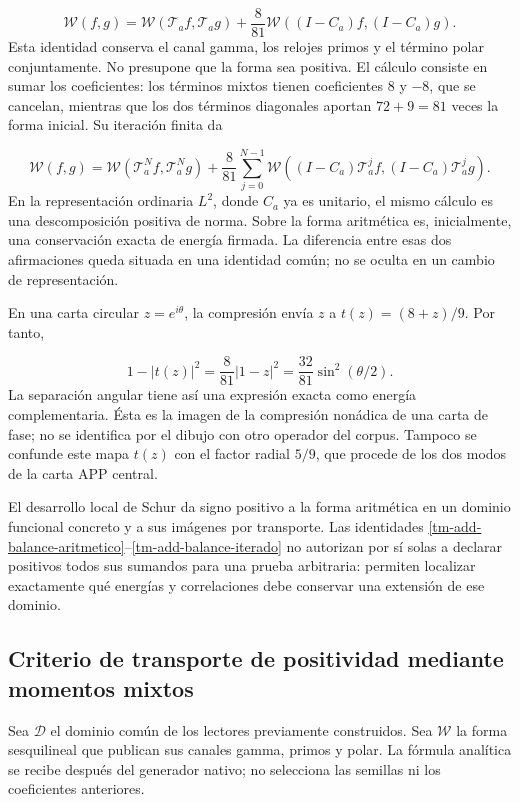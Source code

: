 \begin{equation}
\boxed{\mathscr W(f,g)=\mathscr W(\mathcal T_af,\mathcal T_ag)
+\frac8{81}\mathscr W((I-C_a)f,(I-C_a)g).}
\label{tm-add-balance-aritmetico}
\end{equation}
Esta identidad conserva el canal gamma, los relojes primos y el término polar conjuntamente. No presupone que la forma sea positiva. El cálculo consiste en sumar los coeficientes: los términos mixtos tienen coeficientes \(8\) y \(-8\), que se cancelan, mientras que los dos términos diagonales aportan \(72+9=81\) veces la forma inicial. Su iteración finita da

\begin{equation}
\mathscr W(f,g)=\mathscr W(\mathcal T_a^Nf,\mathcal T_a^Ng)
+\frac8{81}\sum_{j=0}^{N-1}
\mathscr W((I-C_a)\mathcal T_a^jf,(I-C_a)\mathcal T_a^jg).
\label{tm-add-balance-iterado}
\end{equation}
En la representación ordinaria \(L^2\), donde \(C_a\) ya es unitario, el mismo cálculo es una descomposición positiva de norma. Sobre la forma aritmética es, inicialmente, una conservación exacta de energía firmada. La diferencia entre esas dos afirmaciones queda situada en una identidad común; no se oculta en un cambio de representación.

En una carta circular \(z=e^{i\theta}\), la compresión envía \(z\) a \(t(z)=(8+z)/9\). Por tanto,

\[
1-|t(z)|^2=\frac8{81}|1-z|^2
=\frac{32}{81}\sin^2(\theta/2).
\]
La separación angular tiene así una expresión exacta como energía complementaria. Ésta es la imagen de la compresión nonádica de una carta de fase; no se identifica por el dibujo con otro operador del corpus. Tampoco se confunde este mapa \(t(z)\) con el factor radial \(5/9\), que procede de los dos modos de la carta APP central.



El desarrollo local de Schur da signo positivo a la forma aritmética en un dominio funcional concreto y a sus imágenes por transporte. Las identidades \eqref{tm-add-balance-aritmetico}–\eqref{tm-add-balance-iterado} no autorizan por sí solas a declarar positivos todos sus sumandos para una prueba arbitraria: permiten localizar exactamente qué energías y correlaciones debe conservar una extensión de ese dominio.


\subsection{Criterio de transporte de positividad mediante momentos mixtos}
\label{tm-add-c5}
Sea \(\mathcal D\) el dominio común de los lectores previamente construidos. Sea \(\mathscr W\) la forma sesquilineal que publican sus canales gamma, primos y polar. La fórmula analítica se recibe después del generador nativo; no selecciona las semillas ni los coeficientes anteriores.

